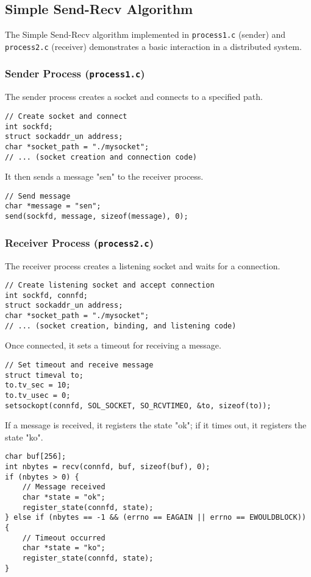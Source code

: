 \documentclass[a4paper,11pt,oneside]{report}
\begin{document}
\subsection{Simple Send-Recv Algorithm}
The Simple Send-Recv algorithm implemented in \texttt{process1.c} (sender) and \texttt{process2.c} (receiver) demonstrates a basic interaction in a distributed system.

\subsubsection{Sender Process (\texttt{process1.c})}
The sender process creates a socket and connects to a specified path. 

\begin{verbatim}
// Create socket and connect
int sockfd;
struct sockaddr_un address;
char *socket_path = "./mysocket";
// ... (socket creation and connection code)
\end{verbatim}

It then sends a message "sen" to the receiver process. 

\begin{verbatim}
// Send message
char *message = "sen";
send(sockfd, message, sizeof(message), 0);
\end{verbatim}

\subsubsection{Receiver Process (\texttt{process2.c})}
The receiver process creates a listening socket and waits for a connection.  

\begin{verbatim}
// Create listening socket and accept connection
int sockfd, connfd;
struct sockaddr_un address;
char *socket_path = "./mysocket";
// ... (socket creation, binding, and listening code)
\end{verbatim}

Once connected, it sets a timeout for receiving a message.

\begin{verbatim}
// Set timeout and receive message
struct timeval to;
to.tv_sec = 10;
to.tv_usec = 0;
setsockopt(connfd, SOL_SOCKET, SO_RCVTIMEO, &to, sizeof(to));
\end{verbatim}

If a message is received, it registers the state "ok"; if it times out, it registers the state "ko". 

\begin{verbatim}
char buf[256];
int nbytes = recv(connfd, buf, sizeof(buf), 0);
if (nbytes > 0) {
    // Message received
    char *state = "ok";
    register_state(connfd, state);
} else if (nbytes == -1 && (errno == EAGAIN || errno == EWOULDBLOCK)) {
    // Timeout occurred
    char *state = "ko";
    register_state(connfd, state);
}
\end{verbatim}
\end{document}
